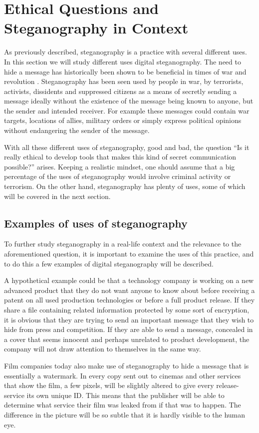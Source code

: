 \section{Ethical Questions and Steganography in Context}
As previously described, steganography is a practice with several different uses. In this section we will study different uses digital steganography.
The need to hide a message has historically been shown to be beneficial in times of war and revolution \citep{Singh2001}.
Steganography has been seen used by people in war, by terrorists, activists, dissidents and suppressed citizens as a means of secretly sending a message ideally without the existence of the message being known to anyone, but the sender and intended receiver.
For example these messages could contain war targets, locations of allies, military orders or simply express political opinions without endangering the sender of the message.

With all these different uses of steganography, good and bad, the question ``Is it really ethical to develop tools that makes this kind of secret communication possible?'' arises. 
Keeping a realistic mindset, one should assume that a big percentage of the uses of steganography would involve criminal activity or terrorism.
On the other hand, steganography has plenty of uses, some of which will be covered in the next section.

\subsection{Examples of uses of steganography}
To further study steganography in a real-life context and the relevance to the aforementioned question, it is important to examine the uses of this practice, and to do this a few examples of digital steganography will be described.

A hypothetical example could be that a technology company is working on a new advanced product that they do not want anyone to know about before receiving a patent on all used production technologies or before a full product release.
If they share a file containing related information protected by some sort of encryption, it is obvious that they are trying to send an important message that they wish to hide from press and competition.
If they are able to send a message, concealed in a cover that seems innocent and perhaps unrelated to product development, the company will not draw attention to themselves in the same way.

Film companies today also make use of steganography to hide a message that is essentially a watermark.
In every copy sent out to cinemas and other services that show the film, a few pixels, will be slightly altered to give every release-service its own unique ID.
This means that the publisher will be able to determine what service their film was leaked from if that was to happen.
The difference in the picture will be so subtle that it is hardly visible to the human eye.


